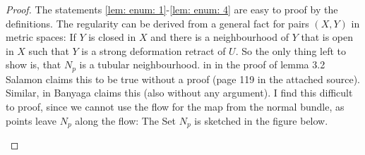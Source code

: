\begin{proof}
    The statements \ref{lem: enum: 1}-\ref{lem: enum: 4} are easy to proof by the definitions. The regularity can be derived from a general fact for pairs $(X,Y)$ in metric spaces: If $Y$ is closed in $X$ and there is a neighbourhood of $Y$ that is open in $X$ such that $Y$ is a strong deformation retract of $U$. So the only thing left to show is, that $N_p$ is a tubular neighbourhood. in \cite{MorseTheorySalmbon} in the proof of lemma 3.2 Salamon claims this to be true without a proof (page 119 in the attached source). Similar, in \cite{banyaga2004lectures} Banyaga claims this (also without any argument).
  I find this difficult to proof, since we cannot use the flow for the map from the normal bundle, as points leave $N_p$ along the flow: The Set $N_p$ is sketched in the figure below. 
    \begin{center}
        

\end{center}
\end{proof}
